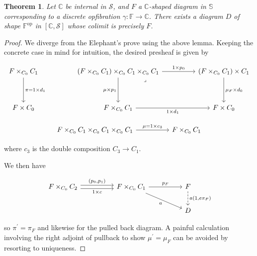 \documentclass[10pt, oneside]{article}
\newtheorem{theorem}{Theorem}[section]
\begin{document}
\begin{theorem}
    Let $\mathbb{C}$ be internal in $\mathcal{S}$, and $F$ a $\mathbb{C}$-shaped diagram in $\mathbb{S}$ corresponding to a discrete opfibration $\gamma: \mathbb{F} \to \mathbb{C}$. There exists a diagram $D$ of shape $\mathbb{F}^\mathrm{op}$ in $[\mathbb{C}, \mathcal{S}]$ whose colimit is precisely $F$.
\end{theorem}
\begin{proof}
    We diverge from the Elephant's prove using the above lemma. Keeping the concrete case in mind for intuition, the desired presheaf is given by 

    \[\begin{tikzcd}[ampersand replacement=\&]
	{F \times_{C_0}C_1} \&\& {(F \times_{C_0} C_1) \times_{C_0} C_1 \times_{C_0} C_1} \&\& {(F \times_{C_0} C_1) \times C_1} \\
	\\
	{F \times C_0} \&\& {F \times_{C_0}C_1} \&\& {F \times C_0}
	\arrow["{\pi = 1 \times d_1}", from=1-1, to=3-1]
	\arrow["{\mu_F \times d_0}", from=1-5, to=3-5]
	\arrow["{1 \times d_1}"', from=3-3, to=3-5]
	\arrow["\lrcorner"{anchor=center, pos=0.125}, draw=none, from=1-3, to=3-5]
	\arrow["{\mu \times p_1}"', from=1-3, to=3-3]
	\arrow["{1 \times p_0}", from=1-3, to=1-5]
\end{tikzcd}\]

\[\begin{tikzcd}[ampersand replacement=\&]
	{F \times_{C_0} C_1 \times_{C_0} C_1 \times_{C_0} C_1} \&\& {F \times_{C_0}C_1}
	\arrow["{\mu = 1 \times c_3}", from=1-1, to=1-3]
\end{tikzcd}\]

\noindent where $c_3$ is the double composition $C_3 \to C_1$.

We then have

\[\begin{tikzcd}[ampersand replacement=\&]
	{F \times_{C_0} C_2} \&\& {F \times_{C_0} C_1} \&\& F \\
	\&\&\&\& D
	\arrow["{1 \times c}"', shift right=1, from=1-1, to=1-3]
	\arrow["{(p_0, p_1)}", shift left=1, from=1-1, to=1-3]
	\arrow["{p_F}", from=1-3, to=1-5]
	\arrow["a"', from=1-3, to=2-5]
	\arrow["{a (1, e \pi_F)}", dashed, from=1-5, to=2-5]
\end{tikzcd}\]

\noindent so $\pi^\prime = \pi_F$ and likewise for the pulled back diagram. A painful calculation involving the right adjoint of pullback  to show $\mu^\prime = \mu_F$ can be avoided by resorting to uniqueness.
\end{proof}
\end{document}
